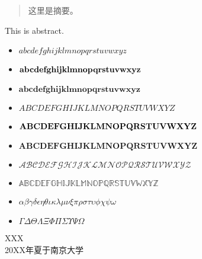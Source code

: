 \documentclass[macfonts,phd]{njuthesis}
\author{XXX}
\institute{南京大学}
\begin{document}

\makenlctitle
\maketitle
\makeenglishtitle


\frontmatter

\begin{abstract}
这里是摘要。
\end{abstract}

\begin{englishabstract}
This is abstract.
\end{englishabstract}

\begin{preface}

\begin{itemize}
\item $abcdefghijklmnopqrstuvwxyz$
\item $\bf{abcdefghijklmnopqrstuvwxyz}$
\item $\boldsymbol{abcdefghijklmnopqrstuvwxyz}$
\item $ABCDEFGHIJKLMNOPQRSTUVWXYZ$
\item $\bf{ABCDEFGHIJKLMNOPQRSTUVWXYZ}$
\item $\boldsymbol{ABCDEFGHIJKLMNOPQRSTUVWXYZ}$
\item $\mathcal{ABCDEFGHIJKLMNOPQRSTUVWXYZ}$
\item $\mathbb{ABCDEFGHIJKLMNOPQRSTUVWXYZ}$
\item $\alpha\beta\gamma\delta\epsilon\eta\theta\iota\kappa\lambda\mu\nu\xi\pi\rho\sigma\tau\upsilon\phi\chi\psi\omega$
\item $\Gamma\Delta\Theta\Lambda\Xi\Phi\Pi\Sigma\Upsilon\Psi\Omega$
\end{itemize}

\begin{flushright}
XXX\\
20XX年夏于南京大学
\end{flushright}
\end{preface}
\end{document}
